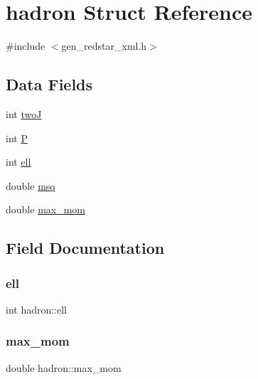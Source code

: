 \hypertarget{structhadron}{}\section{hadron Struct Reference}
\label{structhadron}


{\ttfamily \#include $<$gen\+\_\+redstar\+\_\+xml.\+h$>$}

\subsection*{Data Fields}
\begin{DoxyCompactItemize}
\item 
int \mbox{\hyperlink{structhadron_ae190a1452b80921c1fc32bbfb805ae9d}{twoJ}}
\item 
int \mbox{\hyperlink{structhadron_a317d83c6257a8452f70b2251ec784715}{P}}
\item 
int \mbox{\hyperlink{structhadron_ab5599e4ac9df96aa6107af4412e51815}{ell}}
\item 
double \mbox{\hyperlink{structhadron_aa32b931caa2971c559b462314a745d1a}{msq}}
\item 
double \mbox{\hyperlink{structhadron_a668b950b7a48e196a051668114687d70}{max\+\_\+mom}}
\end{DoxyCompactItemize}


\subsection{Field Documentation}
\mbox{\label{structhadron_ab5599e4ac9df96aa6107af4412e51815}} 
\subsubsection{\texorpdfstring{ell}{ell}}
{\footnotesize\ttfamily int hadron\+::ell}

\mbox{\label{structhadron_a668b950b7a48e196a051668114687d70}} 
\subsubsection{\texorpdfstring{max\_mom}{max\_mom}}
{\footnotesize\ttfamily double hadron\+::max\+\_\+mom}

\mbox{\label{structhadron_aa32b931caa2971c559b462314a745d1a}} 
